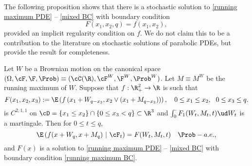 \documentclass[11pt]{article}
\begin{document}
The following proposition shows that there is a stochastic solution to \eqref{running maximum PDE} -- \eqref{mixed BC} with boundary condition 
\begin{equation}
\label{running maximum BC}
F(x_1, x_2, q) = f(x_1, x_2),
\end{equation}
provided an implicit regularity condition on $f$. We do not claim this to be a contribution to the literature on stochastic solutions of parabolic PDEs, but provide the result for completeness. 

\begin{proposition}
\label{proposition: stochastic solution for F(S,M,[S])}

Let $W$ be a Brownian motion on the canonical space $(\Omega, \cF, \F, \Prob) \equiv (\cC(\R), \cF^W, \F^W, \Prob^W)$. Let $M \equiv M^W$ be the running maximum of $W$. Suppose that $f: \R_+^2 \to \R$ is such that
$$
F(x_1,x_2,x_3) := \E \left( f \left( x_1 + W_{q - x_3}, x_2 \vee (x_1 + M_{q- x_3}) \right) \right), \quad  0 \leq x_1 \leq x_2, \ \ 0 \leq x_3 \leq q.
$$
is $C^{2,1,1}$ on $\cD = \{x_1 \leq x_2 \} \cap \{ 0 \leq x_3 < q \} \subset \R^3$ and $\int_0^\cdot F_1(W_t,M_t,t) \ud W_t$ is a martingale. Then for $0 \leq t \leq q$,
\begin{equation}
\label{lookback Markovian property}
\E \left( f(x + W_q, x + M_q) \ | \ \cF_t \right) =  F(W_t, M_t, t) \quad \Prob-a.e.,
\end{equation}
and $F(x)$ is a solution to \eqref{running maximum PDE} -- \eqref{mixed BC} with boundary condition  \eqref{running maximum BC}.

\end{proposition}
\end{document}
